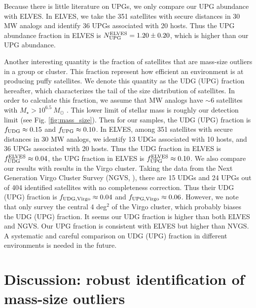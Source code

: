\documentclass[twocolumn,astrosymb,twocolappendix]{aastex631}
\begin{document}
\begin{CJK*}{UTF8}{gbsn}
Because there is little literature on UPGs, we only compare our UPG abundance with ELVES. In ELVES, we take the 351 satellites with secure distances in 30 MW analogs and identify 36 UPGs associated with 20 hosts. Thus the UPG abundance fraction in ELVES is $N_{\rm UPG}^{\rm ELVES} = 1.20 \pm 0.20$, which is higher than our UPG abundance. 

Another interesting quantity is the fraction of satellites that are mass-size outliers in a group or cluster. This fraction represent how efficient an environment is at producing puffy satellites. We denote this quantity as the UDG (UPG) fraction hereafter, which characterizes the tail of the size distribution of satellites. In order to calculate this fraction, we assume that MW analogs have $\sim 6$ satellites with $M_\star > 10^{6.5}\ M_\odot$ \citep{CarlstenELVES2022}. This lower limit of stellar mass is roughly our detection limit (see Fig. \ref{fig:mass_size}). Then for our samples, the UDG (UPG) fraction is $f_{\rm UDG} \approx 0.15$ and $f_{\rm UPG} \approx 0.10$. In ELVES, among 351 satellites with secure distances in 30 MW analogs, we identify 13 UDGs associated with 10 hosts, and 36 UPGs associated with 20 hosts. Thus the UDG fraction in ELVES is $f_{\rm UDG}^{\rm ELVES} \approx 0.04$, the UPG fraction in ELVES is $f_{\rm UPG}^{\rm ELVES} \approx 0.10$. We also compare our results with results in the Virgo cluster. Taking the data from the Next Generation Virgo Cluster Survey (NGVS, \citealt{Ferrarese2020}), there are 15 UDGs and 24 UPGs out of 404 identified satellites with no completeness correction. Thus their UDG (UPG) fraction is $f_{\rm UDG,Virgo} \approx 0.04$ and $f_{\rm UPG,Virgo} \approx 0.06$. However, we note that \citet{Ferrarese2020} only survey the central 4 deg$^2$ of the Virgo cluster, which probably biases the UDG (UPG) fraction. It seems our UDG fraction is higher than both ELVES and NGVS. Our UPG fraction is consistent with ELVES but higher than NVGS. A systematic and careful comparison on UDG (UPG) fraction in different environments is needed in the future. 

\section{Discussion: robust identification of mass-size outliers}\label{sec:discussion}



\end{CJK*}
\end{document}
